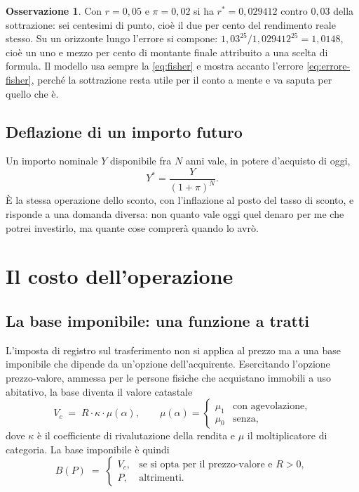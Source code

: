\documentclass[11pt,a4paper]{article}
\theoremstyle{definition}
\newtheorem{osservazione}[definizione]{Osservazione}
\theoremstyle{plain}
\begin{document}
\begin{osservazione}
Con $r=0{,}05$ e $\pi=0{,}02$ si ha $r^*=0{,}029412$ contro $0{,}03$ della sottrazione: sei centesimi di punto, cioè il due per cento del rendimento reale stesso. Su un orizzonte lungo l'errore si compone: $1{,}03^{25}/1{,}029412^{25} = 1{,}0148$, cioè un uno e mezzo per cento di montante finale attribuito a una scelta di formula. Il modello usa sempre la \eqref{eq:fisher} e mostra accanto l'errore \eqref{eq:errore-fisher}, perché la sottrazione resta utile per il conto a mente e va saputa per quello che è.
\end{osservazione}

\subsection{Deflazione di un importo futuro}

Un importo nominale $Y$ disponibile fra $N$ anni vale, in potere d'acquisto di oggi,
\begin{equation}
Y^* = \frac{Y}{(1+\pi)^N}.
\label{eq:deflaziona}
\end{equation}
È la stessa operazione dello sconto, con l'inflazione al posto del tasso di sconto, e risponde a una domanda diversa: non quanto vale oggi quel denaro per me che potrei investirlo, ma quante cose comprerà quando lo avrò.

\section{Il costo dell'operazione}

\subsection{La base imponibile: una funzione a tratti}

L'imposta di registro sul trasferimento non si applica al prezzo ma a una base imponibile che dipende da un'opzione dell'acquirente. Esercitando l'opzione prezzo-valore, ammessa per le persone fisiche che acquistano immobili a uso abitativo, la base diventa il valore catastale
\begin{equation}
V_c \;=\; R \cdot \kappa \cdot \mu(\alpha),
\qquad
\mu(\alpha) = \begin{cases}\mu_1 & \text{con agevolazione},\\ \mu_0 & \text{senza},\end{cases}
\label{eq:catastale}
\end{equation}
dove $\kappa$ è il coefficiente di rivalutazione della rendita e $\mu$ il moltiplicatore di categoria. La base imponibile è quindi
\begin{equation}
B(P) \;=\;
\begin{cases}
V_c, & \text{se si opta per il prezzo-valore e } R>0,\\
P, & \text{altrimenti.}
\end{cases}
\label{eq:base}
\end{equation}
\end{document}
